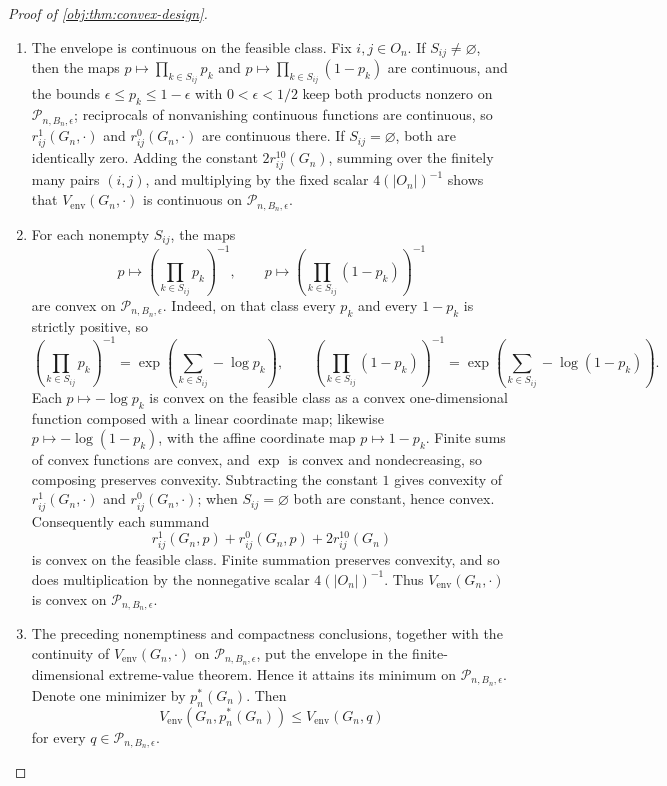 \begin{proof}[Proof of \cref{obj:thm:convex-design}]
\begin{enumerate}
\item The envelope is continuous on the feasible class.  Fix \(i,j\in O_n\).  If \(S_{ij}\neq\varnothing\), then the maps \(p\mapsto\prod_{k\in S_{ij}}p_k\) and \(p\mapsto\prod_{k\in S_{ij}}(1-p_k)\) are continuous, and the bounds \(\epsilon\le p_k\le1-\epsilon\) with \(0<\epsilon<1/2\) keep both products nonzero on \(\mathcal P_{n,B_n,\epsilon}\); reciprocals of nonvanishing continuous functions are continuous, so \(r_{ij}^1(G_n,\cdot)\) and \(r_{ij}^0(G_n,\cdot)\) are continuous there.  If \(S_{ij}=\varnothing\), both are identically zero.  Adding the constant \(2r_{ij}^{10}(G_n)\), summing over the finitely many pairs \((i,j)\), and multiplying by the fixed scalar \(4(|O_n|)^{-1}\) shows that \(V_{\mathrm{env}}(G_n,\cdot)\) is continuous on \(\mathcal P_{n,B_n,\epsilon}\).

\item For each nonempty \(S_{ij}\), the maps
\[
p\longmapsto
\left(\prod_{k\in S_{ij}}p_k\right)^{-1},
\qquad
p\longmapsto
\left(\prod_{k\in S_{ij}}(1-p_k)\right)^{-1}
\]
are convex on \(\mathcal P_{n,B_n,\epsilon}\).  Indeed, on that class every \(p_k\) and every \(1-p_k\) is strictly positive, so
\[
\left(\prod_{k\in S_{ij}}p_k\right)^{-1}
=\exp\left(\sum_{k\in S_{ij}}-\log p_k\right),
\qquad
\left(\prod_{k\in S_{ij}}(1-p_k)\right)^{-1}
=\exp\left(\sum_{k\in S_{ij}}-\log(1-p_k)\right).
\]
Each \(p\mapsto-\log p_k\) is convex on the feasible class as a convex one-dimensional function composed with a linear coordinate map; likewise \(p\mapsto-\log(1-p_k)\), with the affine coordinate map \(p\mapsto1-p_k\).  Finite sums of convex functions are convex, and \(\exp\) is convex and nondecreasing, so composing preserves convexity.  Subtracting the constant \(1\) gives convexity of \(r^1_{ij}(G_n,\cdot)\) and \(r^0_{ij}(G_n,\cdot)\); when \(S_{ij}=\varnothing\) both are constant, hence convex.  Consequently each summand
\[
r^1_{ij}(G_n,p)+r^0_{ij}(G_n,p)+2r^{10}_{ij}(G_n)
\]
is convex on the feasible class.  Finite summation preserves convexity, and so does multiplication by the nonnegative scalar \(4(|O_n|)^{-1}\).  Thus \(V_{\mathrm{env}}(G_n,\cdot)\) is convex on \(\mathcal P_{n,B_n,\epsilon}\).

\item The preceding nonemptiness and compactness conclusions, together with the continuity of \(V_{\mathrm{env}}(G_n,\cdot)\) on \(\mathcal P_{n,B_n,\epsilon}\), put the envelope in the finite-dimensional extreme-value theorem.  Hence it attains its minimum on \(\mathcal P_{n,B_n,\epsilon}\).  Denote one minimizer by \(p_n^*(G_n)\).  Then
\[
V_{\mathrm{env}}(G_n,p_n^*(G_n))
\le V_{\mathrm{env}}(G_n,q)
\]
for every \(q\in\mathcal P_{n,B_n,\epsilon}\).


\end{enumerate}
\end{proof}
